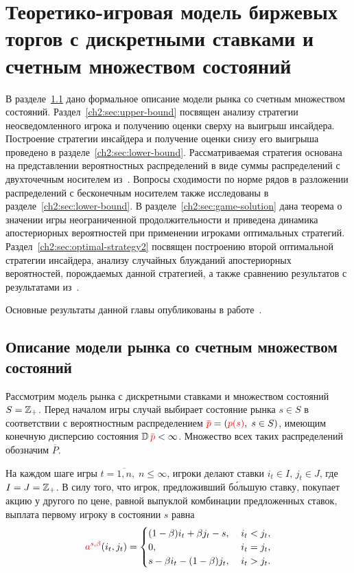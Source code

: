 \chapter{Теоретико-игровая модель биржевых торгов с дискретными ставками и счетным множеством состояний} \label{chapt2}
{
\newcommand{\s}{\ensuremath{s}}
\newcommand{\norm}[1]{\left\lVert#1\right\rVert}
\newcommand{\LL}{L^1(\{s^2\})}
\newcommand{\PM}{\ensuremath{\overline{P}}}

В разделе~\ref{ch2:sec:intro} дано формальное описание модели рынка со счетным множеством состояний.
Раздел~\ref{ch2:sec:upper-bound} посвящен анализу стратегии неосведомленного игрока и получению оценки сверху на выигрыш инсайдера.
Построение стратегии инсайдера и получение оценки снизу его выигрыша проведено в разделе~\ref{ch2:sec:lower-bound}.
Рассматриваемая стратегия основана на представлении вероятностных распределений в виде суммы распределений с двухточечным носителем из~\cite{domansky11}.
Вопросы сходимости по норме рядов в разложении распределений с бесконечным носителем также исследованы в разделе~\ref{ch2:sec:lower-bound}.
В разделе~\ref{ch2:sec:game-solution} дана теорема о значении игры неограниченной продолжительности и приведена динамика апостериорных вероятностей при применении игроками оптимальных стратегий.
Раздел~\ref{ch2:sec:optimal-strategy2} посвящен построению второй оптимальной стратегии инсайдера, анализу случайных блужданий апостериорных вероятностей, порождаемых данной стратегией, а также сравнению результатов с результатами из~\cite{domansky11}.

Основные результаты данной главы опубликованы в работе~\cite{pyanykh:orm2016}.

\section{Описание модели рынка со счетным множеством состояний}
\label{ch2:sec:intro}

Рассмотрим модель рынка с дискретными ставками и множеством состояний $S = \mathbb{Z}_+$.
Перед началом игры случай выбирает состояние рынка $\s \in S$ в соответствии с вероятностным распределением $\pd = (\pc{s}, \; s \in S)$, имеющим конечную дисперсию состояния $\D \pd < \infty$.
Множество всех таких распределений обозначим $\PM$.

На каждом шаге игры $t = \overline{1,n}, \; n \leqslant \infty$, игроки делают ставки $i_t \in I, \, j_t \in J$, где $I = J = \mathbb{Z}_+$.
В силу того, что игрок, предложивший б\'{о}льшую ставку, покупает акцию у другого по цене, равной выпуклой комбинации предложенных ставок, выплата первому игроку в состоянии $s$ равна
\begin{equation*}
  \as(i_t, j_t) =
  \begin{cases}
    (1-\beta) i_t + \beta j_t - s, &\; i_t < j_t, \\
    0, &\; i_t = j_t, \\
    s - \beta i_t - (1-\beta)j_t, &\; i_t > j_t.
  \end{cases}
\end{equation*}

}
